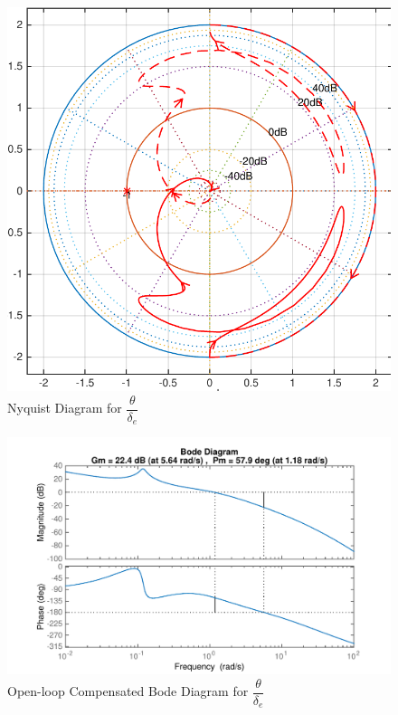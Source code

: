 \documentclass[11pt]{article}
\begin{document}
\begin{figure}[b!]
\begin{center}
\includegraphics[height=.4\textheight]{figures/nyquist_theta}
\caption{Nyquist Diagram for $\dfrac{\theta}{\delta_e}$}
\end{center}
\end{figure}

\begin{figure}[h!]
\begin{center}
\includegraphics[height=.4\textheight]{figures/open_comp_theta}
\caption{Open-loop Compensated Bode Diagram for $\dfrac{\theta}{\delta_e}$}
\end{center}
\end{figure}
\end{document}
